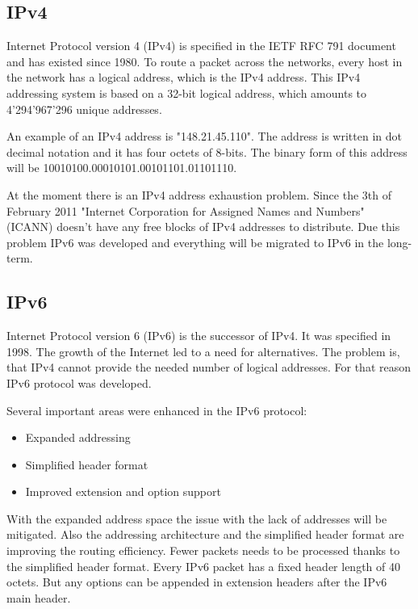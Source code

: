 \documentclass[a4paper]{report}
\begin{document}
\subsection{IPv4}
\label{ssec:IPv4}
Internet Protocol version 4 (IPv4) is specified in the IETF RFC 791 document \parencite{Postel} and has existed since 1980. To route a packet across the networks, every host in the network has a logical address, which is the IPv4 address. This IPv4 addressing system is based on a 32-bit logical address, which amounts to 4'294'967'296 unique addresses.

An example of an IPv4 address is "148.21.45.110". The address is written in dot decimal notation and it has four octets of 8-bits. The binary form of this address will be 10010100.00010101.00101101.01101110. \parencite{Babatunde2014}

At the moment there is an IPv4 address exhaustion problem. Since the 3th of February 2011 "Internet Corporation for Assigned Names and Numbers" (ICANN) doesn't have any free blocks of IPv4 addresses to distribute. Due this problem IPv6 was developed and everything will be migrated to IPv6 in the long-term. 
\subsection{IPv6}
\label{ssec:IPv6}
Internet Protocol version 6 (IPv6) is the successor of IPv4. It was specified in 1998. The growth of the Internet led to a need for alternatives. The problem is, that IPv4 cannot provide the needed number of logical addresses. For that reason IPv6 protocol was developed.\parencite[11]{Babatunde2014}

Several important areas were enhanced in the IPv6 protocol:
\begin{itemize}
	\item Expanded addressing
	\item Simplified header format
	\item Improved extension and option support
\end{itemize}
With the expanded address space the issue with the lack of addresses will be mitigated. Also the addressing architecture and the simplified header format are improving the routing efficiency. Fewer packets needs to be processed thanks to the simplified header format. 
Every IPv6 packet has a fixed header length of 40 octets. But any options can be appended in extension headers after the IPv6 main header. \parencite[106-107,123-124]{Loshin2004}
\end{document}
